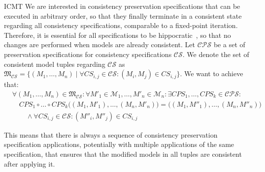 \begin{copiedFrom}{ICMT}
We are interested in consistency preservation specifications that can be executed in arbitrary order, so that they finally terminate in a consistent state regarding all consistency specifications, comparable to a fixed-point iteration.
Therefore, it is essential for all specifications to be hippocratic~\cite{stevens2010sosym}, so that no changes are performed when models are already consistent.
Let $\mathcal{CPS}$ be a set of preservation specifications %
for consistency specifications $\mathcal{CS}$. %
We denote the set of consistent model tuples regarding $\mathcal{CS}$ as $\mathfrak{M}_{\mathcal{CS}} = \{(M_1, \dots, M_n) \mid %
\forall \mathit{CS}_{i,j} \in \mathcal{CS} : (M_i, M_j) \in \mathit{CS}_{i, j}\}$.
We want to achieve that:
\begin{align*}
    & \forall (M_1, \dots, M_n) \in \mathfrak{M}_{\mathcal{CS}} : %
    \forall M'_1 \in \mathcal{M}_1, \dots, M'_n \in \mathcal{M}_n : \exists \mathit{CPS}_1, \dots, \mathit{CPS}_k \in \mathcal{CPS} : \\
    & \hspace{1em} \mathit{CPS}_1 \circ \dots \circ \mathit{CPS}_k \big( (M_1, M'_1), \dots, (M_n, M'_n) \big) = \big( (M_1, M''_1), \dots, (M_n, M''_n) \big) \\
    & \hspace{2em} \land \forall \mathit{CS}_{i,j} \in \mathcal{CS} : (M''_i, M''_j) \in \mathit{CS}_{i, j} %
\end{align*}

This means that there is always a sequence of consistency preservation specification applications, potentially with multiple applications of the same specification, that ensures that the modified models in all tuples are consistent after applying it.


\end{copiedFrom}
